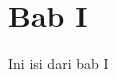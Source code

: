 \documentclass[a4paper, 12pt]{article}
\begin{document}
\section{Bab I}
Ini isi dari bab I
\end{document}
